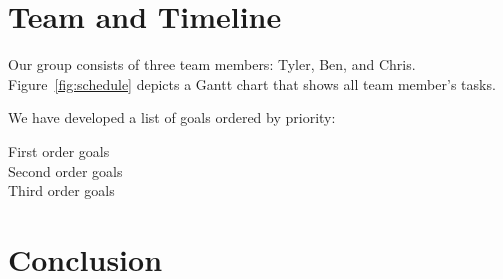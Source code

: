 \documentclass{acm_proc_article-sp}
\begin{document}
\section{Team and Timeline}

Our group consists of three team members: Tyler, Ben, and Chris.
Figure~\ref{fig:schedule} depicts a Gantt chart that shows all team member's
tasks.

We have developed a list of goals ordered by priority:
\begin{description}
	\item[First order goals]
	\item[Second order goals]
	\item[Third order goals]
\end{description}

\section{Conclusion}
\end{document}
